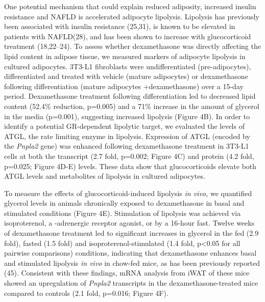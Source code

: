 \documentclass[11pt]{article} %
\begin{document}
One potential mechanism that could explain reduced adiposity, increased
insulin resistance and NAFLD is accelerated adipocyte lipolysis.
Lipolysis has previously been associated with insulin resistance
(25,31), is known to be elevated in patients with NAFLD(28), and has
been shown to increase with glucocorticoid treatment (18,22--24). To
assess whether dexamethasone was directly affecting the lipid content in
adipose tissue, we measured markers of adipocyte lipolysis in cultured
adipocytes. 3T3-L1 fibroblasts were undifferentiated (pre-adipocytes),
differentiated and treated with vehicle (mature adipocytes) or
dexamethasone following differentiation (mature adipocytes
+dexamethasone) over a 15-day period. Dexamethasone treatment following
differentiation led to decreased lipid content (52.4\% reduction,
p=0.005) and a 71\% increase in the amount of glycerol in the media
(p=0.001), suggesting increased lipolysis (Figure 4B). In order to
identify a potential GR-dependent lipolytic target, we evaluated the
levels of ATGL, the rate limiting enzyme in lipolysis. Expression of
ATGL (encoded by the \emph{Pnpla2} gene) was enhanced following
dexamethasone treatment in 3T3-L1 cells at both the transcript (2.7
fold, p=0.002; Figure 4C) and protein (4.2 fold, p=0.025; Figure 4D-E)
levels. These data show that glucocorticoids elevate both ATGL levels
and metabolites of lipolysis in cultured adipocytes.

To measure the effects of glucocorticoid-induced lipolysis \emph{in
vivo,} we quantified glycerol levels in animals chronically exposed to
dexamethasone in basal and stimulated conditions (Figure 4E).
Stimulation of lipolysis was achieved via isoproterenol, a -adrenergic
receptor agonist, or by a 16-hour fast. Twelve weeks of dexamethasone
treatment led to significant increases in glycerol in the fed (2.9
fold), fasted (1.5 fold) and isoproterenol-stimulated (1.4 fold,
p\textless{}0.05 for all pairwise comparisons) conditions, indicating
that dexamethasone enhances basal and stimulated lipolysis \emph{in
vivo} in chow-fed mice, as has been previously reported (45). Consistent
with these findings, mRNA analysis from iWAT of these mice showed an
upregulation of \emph{Pnpla2} transcripts in the dexamethasone-treated
mice compared to controls (2.1 fold, p=0.016; Figure 4F).
\end{document}
